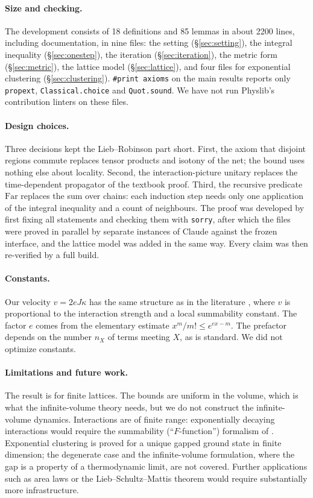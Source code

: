 \documentclass[11pt]{article}
\theoremstyle{definition}
\theoremstyle{remark}
\newcommand{\Far}{\mathrm{Far}}
\begin{document}
\paragraph{Size and checking.} The development consists of 18 definitions and 85 lemmas in
about 2200 lines, including documentation, in nine files: the setting (\S\ref{sec:setting}), the
integral inequality (\S\ref{sec:onestep}), the iteration (\S\ref{sec:iteration}), the metric form
(\S\ref{sec:metric}), the lattice model (\S\ref{sec:lattice}), and four files for exponential
clustering (\S\ref{sec:clustering}). \texttt{\#print axioms} on the
main results reports only \texttt{propext}, \texttt{Classical.choice} and \texttt{Quot.sound}. We
have not run Physlib's contribution linters on these files.

\paragraph{Design choices.} Three decisions kept the Lieb--Robinson part short. First, the axiom that
disjoint regions commute replaces tensor products and isotony of the net; the bound uses nothing
else about locality. Second, the interaction-picture unitary replaces the time-dependent
propagator of the textbook proof. Third, the recursive predicate $\Far$ replaces the sum over
chains: each induction step needs only one application of the integral inequality and a count
of neighbours. The proof was developed by first fixing all statements and checking them with
\texttt{sorry}, after which the files were proved in parallel by separate instances of Claude
against the frozen interface, and the lattice model was added in the same way. Every claim was then re-verified by a full build.

\paragraph{Constants.} Our velocity $v=2eJ\kappa$ has the same structure as in the literature
\cite{nachtergaelesims2006,nachtergaelesims2010}, where $v$ is proportional to the interaction
strength and a local summability constant. The factor $e$ comes from the elementary estimate
$x^m/m!\le e^{ex-m}$. The prefactor depends on the number $n_X$ of terms meeting $X$, as is
standard. We did not optimize constants.

\paragraph{Limitations and future work.} The result is for finite lattices. The bounds are uniform
in the volume, which is what the infinite-volume theory needs, but we do not construct the
infinite-volume dynamics. Interactions are of finite range: exponentially decaying interactions
would require the summability (``$F$-function'') formalism of \cite{nachtergaeleogatasims2006}.
Exponential clustering is proved for a unique gapped ground state in finite dimension; the
degenerate case and the infinite-volume formulation, where the gap is a property of a
thermodynamic limit, are not covered. Further applications such as area laws or the
Lieb--Schultz--Mattis theorem would require substantially more infrastructure.
\end{document}
